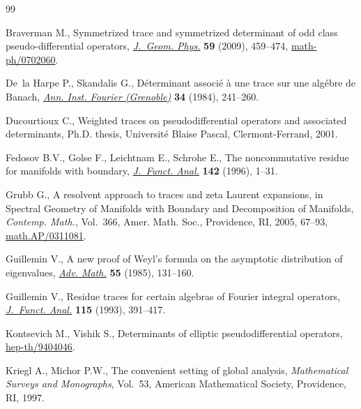\documentclass[pdftex]{sigma}
\begin{document}
\begin{thebibliography}{99}
\footnotesize\itemsep=0pt

Braverman M., Symmetrized trace and symmetrized determinant of odd class
  pseudo-dif\/ferential operators, \href{http://dx.doi.org/10.1016/j.geomphys.2008.12.003}{\textit{J.~Geom. Phys.}} \textbf{59} (2009),
  459--474, \href{http://arxiv.org/abs/math-ph/0702060}{math-ph/0702060}.

De~la Harpe P., Skandalis G., D\'eterminant associ\'e \`a une trace sur une
  alg\'ebre de {B}anach, \href{http://dx.doi.org/10.5802/aif.958}{\textit{Ann. Inst. Fourier (Grenoble)}} \textbf{34}
  (1984), 241--260.

Ducourtioux C., Weighted traces on pseudodif\/ferential operators and associated
  determinants, Ph.D. thesis, Universit\'e Blaise Pascal, Clermont-Ferrand,
  2001.

Fedosov B.V., Golse F., Leichtnam E., Schrohe E., The noncommutative residue
  for manifolds with boundary, \href{http://dx.doi.org/10.1006/jfan.1996.0142}{\textit{J.~Funct. Anal.}} \textbf{142} (1996),
  1--31.

Grubb G., A resolvent approach to traces and zeta {L}aurent expansions, in
  Spectral Geometry of Manifolds with Boundary and Decomposition of Manifolds,
  \textit{Contemp. Math.}, Vol.~366, Amer. Math. Soc., Providence, RI, 2005,
  67--93, \href{http://arxiv.org/abs/math.AP/0311081}{math.AP/0311081}.

Guillemin V., A new proof of {W}eyl's formula on the asymptotic distribution of
  eigenvalues, \href{http://dx.doi.org/10.1016/0001-8708(85)90018-0}{\textit{Adv. Math.}} \textbf{55} (1985), 131--160.

Guillemin V., Residue traces for certain algebras of {F}ourier integral
  operators, \href{http://dx.doi.org/10.1006/jfan.1993.1096}{\textit{J.~Funct. Anal.}} \textbf{115} (1993), 391--417.

Kontsevich M., Vishik S., Determinants of elliptic pseudodif\/ferential
  operators, \href{http://arxiv.org/abs/hep-th/9404046}{hep-th/9404046}.

Kriegl A., Michor P.W., The convenient setting of global analysis,
  \textit{Mathematical Surveys and Monographs}, Vol.~53, American Mathematical
  Society, Providence, RI, 1997.


\end{thebibliography}
\end{document}
